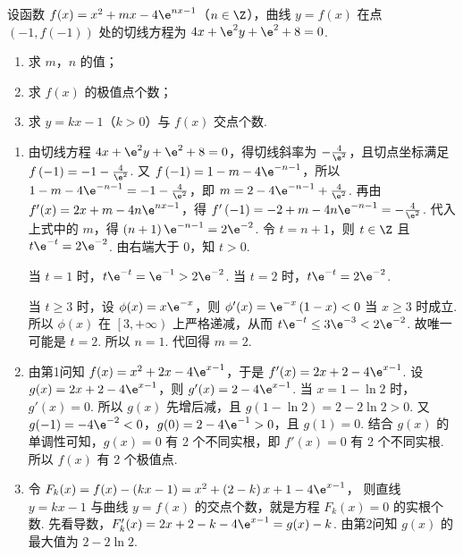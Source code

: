 \documentclass[UTF8,a4paper,oneside,11pt]{ctexbook}
\begin{document}
\begin{problem}
设函数 \( f(x)=x^2+mx-4\e^{nx-1} \)（\( n\in \Z \)），曲线 \( y=f(x) \) 在点 \( \left( -1,f(-1) \right) \) 处的切线方程为 \( 4x+\e^2y+\e^2+8=0 \).

\begin{enumerate}
\item 求 \( m \)，\( n \) 的值；
\item 求 \( f(x) \) 的极值点个数；
\item 求 \( y=kx-1 \)（\( k>0 \)）与 \( f(x) \) 交点个数.
\end{enumerate}
\end{problem}

\begin{solution}
\begin{enumerate}
\item 由切线方程 \( 4x+\e^2y+\e^2+8=0 \)，得切线斜率为 \( -\frac{4}{\e^2} \)，且切点坐标满足 \( f\left( -1 \right)=-1-\frac{4}{\e^2} \).
又 \( f\left( -1 \right)=1-m-4\e^{-n-1} \)，所以 \( 1-m-4\e^{-n-1}=-1-\frac{4}{\e^2} \)，即 \( m=2-4\e^{-n-1}+\frac{4}{\e^2} \).
再由 \( f'(x)=2x+m-4n\e^{nx-1} \)，得 \( f'\left( -1 \right)=-2+m-4n\e^{-n-1}=-\frac{4}{\e^2} \). 代入上式中的 \( m \)，得 \( \left( n+1 \right)\e^{-n-1}=2\e^{-2} \). 令 \( t=n+1 \)，则 \( t\in \Z \) 且 \( t\e^{-t}=2\e^{-2} \).
由右端大于 0，知 \( t>0 \).

当 \( t=1 \) 时，\( t\e^{-t}=\e^{-1}>2\e^{-2} \). 当 \( t=2 \) 时，\( t\e^{-t}=2\e^{-2} \).

当 \( t\ge 3 \) 时，设 \( \phi(x)=x\e^{-x} \)，则 \( \phi'(x)=\e^{-x}\left( 1-x \right)<0 \)
当 \( x\ge 3 \) 时成立.
所以 \( \phi(x) \) 在 \( \left[ 3,+\infty \right) \) 上严格递减，从而 \( t\e^{-t}\le 3\e^{-3}<2\e^{-2} \).
故唯一可能是 \( t=2 \). 所以 \( n=1 \). 代回得 \( m=2 \).

\item 由第1问知 \( f(x)=x^2+2x-4\e^{x-1} \)，于是 \( f'(x)=2x+2-4\e^{x-1} \). 设 \( g(x)=2x+2-4\e^{x-1} \)，则 \( g'(x)=2-4\e^{x-1} \). 当 \( x=1-\ln 2 \) 时，\( g'(x)=0 \). 所以 \( g(x) \) 先增后减，且 \( g\left( 1-\ln 2 \right)=2-2\ln 2>0 \).
又 \( g(-1)=-4\e^{-2}<0 \)，\( g(0)=2-4\e^{-1}>0 \)，且 \( g(1)=0 \). 结合 \( g(x) \) 的单调性可知，\( g(x)=0 \) 有 2 个不同实根，即 \( f'(x)=0 \) 有 2 个不同实根. 所以 \( f(x) \) 有 2 个极值点.

\item 令 \( F_k(x)=f(x)-\left( kx-1 \right)=x^2+\left( 2-k \right)x+1-4\e^{x-1} \)，
则直线 \( y=kx-1 \) 与曲线 \( y=f(x) \) 的交点个数，就是方程 \( F_k(x)=0 \) 的实根个数.
先看导数，\( F_k'(x)=2x+2-k-4\e^{x-1}=g(x)-k \).
由第2问知 \( g(x) \) 的最大值为 \( 2-2\ln 2 \).


\end{enumerate}
\end{solution}
\end{document}
